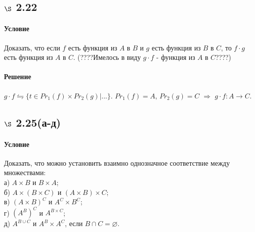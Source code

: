 \documentclass[a4paper,12pt]{article}
\begin{document}
\subsection*{$\S$ 2.22}
\paragraph*{Условие}
Доказать, что если $f$ есть функция из $A$ в $B$ и $g$ есть функция из $B$ в $C$, то $f\cdot g$ есть функция из $A$ в $C$. (????Имелось в виду $g\cdot f$ - функция из $A$ в $C$????)
\paragraph*{Решение}
$g\cdot f \leftrightharpoons \{t\in Pr_1(f)\times Pr_2(g)| ...\}$. $Pr_1(f)=A$, $Pr_2(g)=C$ $\Rightarrow$ $g \cdot f: A\to C$. 


\subsection*{$\S$ 2.25(а-д)}
\paragraph*{Условие}
Доказать, что можно установить взаимно однозначное соответствие между множествами:\\
а) $A\times B$ и $B\times A$;\\
б) $A\times (B\times C)$ и $(A\times B)\times C$;\\
в) $(A\times B)^C$ и $A^C\times B^C$;\\
г) $(A^B)^C$ и $A^{B\times C}$;\\
д) $A^{B\cup C}$ и $A^B\times A^C$, если $B\cap C = \varnothing$.
\end{document}
